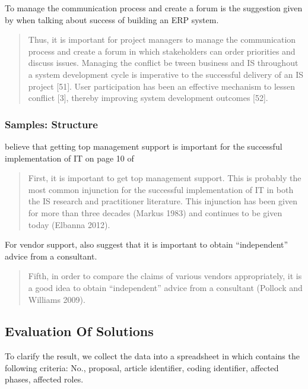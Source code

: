 To manage the communication process and create a forum is the suggestion given by \citeauthor{2} when talking about success of building an ERP system.
\begin{quotation}
Thus, it is important for project managers to manage the communication process and create a forum in which stakeholders can order priorities and discuss issues. Managing the conflict be tween business and IS throughout a system development cycle is imperative to the successful delivery of an IS project [51]. User participation has been an effective mechanism to lessen conflict [3], thereby improving system development outcomes [52].
\end{quotation}


\subsubsection{Samples: Structure}
\citeauthor{6} believe that getting top management support is important for the successful implementation of IT on page 10 of 
\begin{quotation}
First, it is important to get top management support. This is probably the most common injunction for the successful implementation of IT in both the IS research and practitioner literature. This injunction has been given for more than three decades (Markus 1983) and continues to be given today (Elbanna 2012).
\end{quotation}

For vendor support, \citeauthor{6} also suggest that it is important to obtain “independent” advice from a consultant.
\begin{quotation}
Fifth, in order to compare the claims of various vendors appropriately, it is a good idea to obtain “independent” advice from a consultant (Pollock and Williams 2009).
\end{quotation}

\subsection{Evaluation Of Solutions}
To clarify the result, we collect the data into a spreadsheet in which contains the following criteria: No., proposal, article identifier, coding identifier, affected phases, affected roles.

